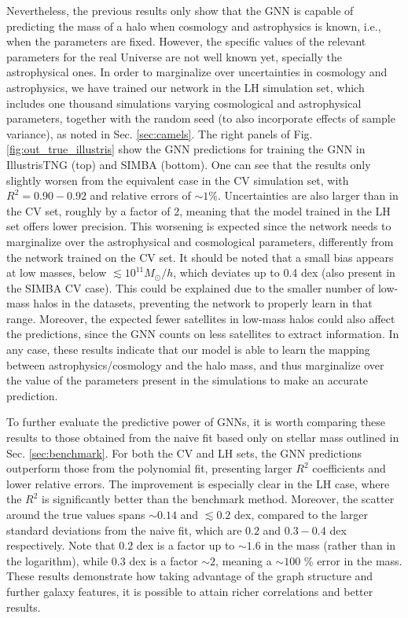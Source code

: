 \documentclass[twocolumn]{aastex631}
\begin{document}
Nevertheless, the previous results only show that the GNN is capable of predicting the mass of a halo when cosmology and astrophysics is known, i.e., when the parameters are fixed. However, the specific values of the relevant parameters for the real Universe are not well known yet, specially the astrophysical ones. In order to marginalize over uncertainties in cosmology and astrophysics, we have trained our network in the LH simulation set, which includes one thousand simulations varying cosmological and astrophysical parameters, together with the random seed (to also incorporate effects of sample variance), as noted in Sec. \ref{sec:camels}. The right panels of Fig. \ref{fig:out_true_illustris} show the GNN predictions for training the GNN in IllustrisTNG (top) and SIMBA (bottom). One can see that the results only slightly worsen from the equivalent case in the CV simulation set, with $R^2=0.90-0.92$ and relative errors of $\sim 1\%$. Uncertainties are also larger than in the CV set, roughly by a factor of 2, meaning that the model trained in the LH set offers lower precision. This worsening is expected since the network needs to marginalize over the astrophysical and cosmological parameters, differently from the network trained on the CV set. It should be noted that a small bias appears at low masses, below $\lesssim 10^{11} M_\odot/h$, which deviates up to 0.4 dex (also present in the SIMBA CV case). This could be explained due to the smaller number of low-mass halos in the datasets, preventing the network to properly learn in that range. Moreover, the expected fewer satellites in low-mass halos could also affect the predictions, since the GNN counts on less satellites to extract information. In any case, these results indicate that our model is able to learn the mapping between astrophysics/cosmology and the halo mass, and thus marginalize over the value of the parameters present in the simulations to make an accurate prediction.


To further evaluate the predictive power of GNNs, it is worth comparing these results to those obtained from the naive fit based only on stellar mass outlined in Sec. \ref{sec:benchmark}. For both the CV and LH sets, the GNN predictions outperform those from the polynomial fit, presenting larger $R^2$ coefficients and lower relative errors. The improvement is especially clear in the LH case, where the $R^2$ is significantly better than  the benchmark method. Moreover, the scatter around the true values spans $\sim 0.14$ and $\lesssim 0.2$ dex, compared to the larger standard deviations from the naive fit, which are $0.2$ and $0.3-0.4$ dex respectively. Note that $0.2$ dex is a factor up to $\sim 1.6$ in the mass (rather than in the logarithm), while $0.3$ dex is a factor $\sim 2$, meaning a $\sim 100$ \% error in the mass. These results demonstrate how taking advantage of the graph structure and further galaxy features, it is possible to attain richer correlations and better results.
\end{document}

